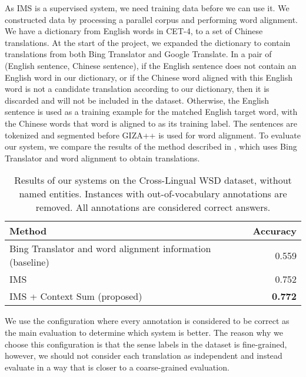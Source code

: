 \documentclass[11pt]{article}
\begin{document}
{As IMS is a supervised system, we need  training data before we can use it. We constructed data by processing a parallel corpus and performing word alignment. We have a dictionary from English words in CET-4, to a set of Chinese translations. At the start of the project, we expanded the dictionary to contain translations from both Bing Translator and Google Translate. In a pair of (English sentence, Chinese sentence), if the English sentence does not contain an English word in our dictionary, or if the Chinese word aligned with this English word is not a candidate translation according to our dictionary, then it is discarded and will not be included in the dataset. Otherwise, the English sentence is used as a training example for the matched English target word, with the Chinese words that word is aligned to as its training label. The sentences are tokenized and segmented before GIZA++ \cite {och03} is used for word alignment. To evaluate our system, we compare the results of the method described in \cite{tao2014}, which uses Bing Translator and word alignment to obtain translations.


\begin{table}[ht]
	\caption{Results of our systems on the Cross-Lingual WSD dataset, without named entities. Instances with out-of-vocabulary annotations are removed. All annotations are considered correct answers.}
	\label{table:CLWSD-test-results}
	\begin{center}

			\begin{tabular}{| p{9cm}| r| }
				\hline
				Method & Accuracy \\
				\hline
				Bing Translator and 
                word alignment information (baseline) & 0.559  \\
				\hline
				IMS & 0.752  \\
				\hline
				IMS + Context Sum (proposed) & {\bf 0.772}  \\
				\hline
			\end{tabular}

	\end{center}
\end{table}

We use the configuration where every annotation is considered to be correct as the main evaluation to determine which system is better. The reason why we choose this configuration is that the sense labels in the dataset is fine-grained, however, we should not consider each translation as independent and instead evaluate in a way that is closer to a coarse-grained evaluation. 

}
\end{document}
